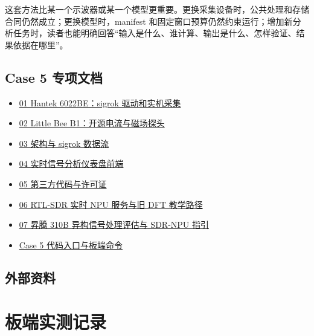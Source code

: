 这套方法比某一个示波器或某一个模型更重要。更换采集设备时，公共处理和存储合同仍然成立；更换模型时，manifest
和固定窗口预算仍然约束运行；增加新分析任务时，读者也能明确回答``输入是什么、谁计算、输出是什么、怎样验证、结果依据在哪里''。

\subsection{Case 5
专项文档}\label{src-experiment-case5-project-references}

\begin{itemize}
\tightlist
\item
  \href{https://github.com/zhouxzh/Ascend310/blob/main/samples/case5/docs/01_hantek6022be.md}{01
  Hantek 6022BE：sigrok 驱动和实机采集}
\item
  \href{https://github.com/zhouxzh/Ascend310/blob/main/samples/case5/docs/02_little_bee_b1.md}{02
  Little Bee B1：开源电流与磁场探头}
\item
  \href{https://github.com/zhouxzh/Ascend310/blob/main/samples/case5/docs/03_architecture.md}{03
  架构与 sigrok 数据流}
\item
  \href{https://github.com/zhouxzh/Ascend310/blob/main/samples/case5/docs/04_frontend_design.md}{04
  实时信号分析仪表盘前端}
\item
  \href{https://github.com/zhouxzh/Ascend310/blob/main/samples/case5/docs/05_third_party_licenses.md}{05
  第三方代码与许可证}
\item
  \href{https://github.com/zhouxzh/Ascend310/blob/main/samples/case5/docs/06_rtl_sdr_npu_demo.md}{06
  RTL-SDR 实时 NPU 服务与旧 DFT 教学路径}
\item
  \href{https://github.com/zhouxzh/Ascend310/blob/main/samples/case5/docs/07_ascend310b_heterogeneous_signal_processing.md}{07
  昇腾 310B 异构信号处理评估与 SDR-NPU 指引}
\item
  \href{https://github.com/zhouxzh/Ascend310/blob/main/samples/case5/README.md}{Case
  5 代码入口与板端命令}
\end{itemize}

\subsection{外部资料}\label{src-experiment-case5-external-references}

\section{板端实测记录}\label{src-experiment-case5-board-evidence}

